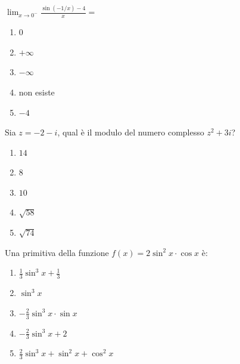 \begin{quiz}
$\displaystyle\lim_{x\to0^-}\frac{\sin(-1/x)-4}{x}=$
\begin{enumerate}
\item $0$
\item $+\infty$
\item $-\infty$
\item non esiste
\item $-4$
\end{enumerate}
\end{quiz}

\begin{quiz}
Sia $z=-2-i$, qual \`e il modulo del numero complesso $z^2+3i$?
\begin{enumerate}
\item $14$
\item $8$
\item $10$
\item $\sqrt{58}$
\item $\sqrt{74}$
\end{enumerate}
\end{quiz}

\begin{quiz}
Una primitiva della funzione $f(x)=2\sin^2x\cdot\cos x$ \`e:
\begin{enumerate}
\item $\frac13\sin^3x+\frac13$
\item $\sin^3x$
\item $-\frac23\sin^3x\cdot\sin x$
\item $-\frac23\sin^3x+2$
\item $\frac23\sin^3x+\sin^2x+\cos^2x$
\end{enumerate}
\end{quiz}

